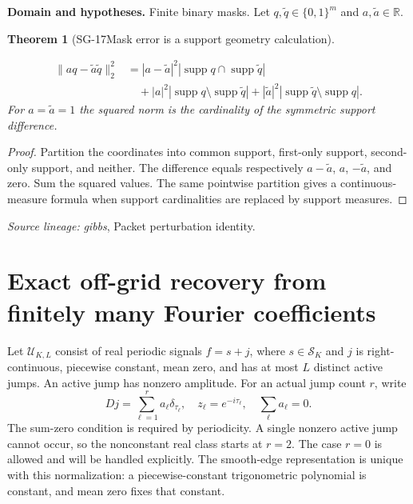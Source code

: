 \documentclass[11pt]{article}
\newtheorem{theorem}{Theorem}[section]
\theoremstyle{definition}\newtheorem{definition}[theorem]{Definition}
\theoremstyle{remark}\newtheorem{remark}[theorem]{Remark}
\begin{document}
\par{\small\textbf{Domain and hypotheses.} Finite binary masks. Let $q,\widetilde q\in\{0,1\}^m$ and $a,\widetilde a\in\mathbb R$.}\par
\begin{theorem}[SG-17\quad Mask error is a support geometry calculation]\label{SG-17}

\begin{align*}
 \|aq-\widetilde a\widetilde q\|_2^2
 &=|a-\widetilde a|^2|\operatorname{supp}q\cap\operatorname{supp}\widetilde q|\\
 &\quad+|a|^2|\operatorname{supp}q\setminus\operatorname{supp}\widetilde q|
 +|\widetilde a|^2|\operatorname{supp}\widetilde q\setminus\operatorname{supp}q|.
\end{align*}
For $a=\widetilde a=1$ the squared norm is the cardinality of the symmetric
support difference.

\end{theorem}
\begin{proof}

Partition the coordinates into common support, first-only support,
second-only support, and neither. The difference equals respectively
$a-\widetilde a$, $a$, $-\widetilde a$, and zero. Sum the squared values.
The same pointwise partition gives a continuous-measure formula when support
cardinalities are replaced by support measures.

\end{proof}

\par{\small\color{Teal}\textit{Source lineage:} \textit{gibbs}, Packet perturbation identity.}\par

\section{Exact off-grid recovery from finitely many Fourier coefficients}

Let $\mathcal U_{K,L}$ consist of real periodic signals $f=s+j$, where
$s\in\mathcal S_K$ and $j$ is right-continuous, piecewise constant, mean zero,
and has at most $L$ distinct active jumps. An active jump has nonzero amplitude.
For an actual jump count $r$, write
\[
 Dj=\sum_{\ell=1}^r a_\ell\delta_{\tau_\ell},\quad
 z_\ell=e^{-i\tau_\ell},\quad\sum_\ell a_\ell=0.
\]
The sum-zero condition is required by periodicity. A single nonzero active
jump cannot occur, so the nonconstant real class starts at $r=2$. The case
$r=0$ is allowed and will be handled explicitly. The smooth-edge
representation is unique with this normalization: a piecewise-constant
trigonometric polynomial is constant, and mean zero fixes that constant.
\end{document}
